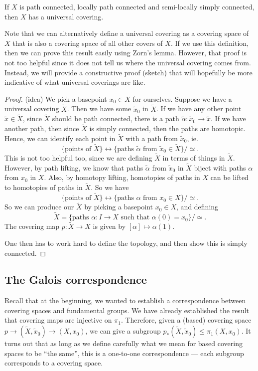\documentclass[a4paper]{article}
\begin{document}
\begin{thm}
  If $X$ is path connected, locally path connected and semi-locally simply connected, then $X$ has a universal covering.
\end{thm}
Note that we can alternatively define a universal covering as a covering space of $X$ that is also a covering space of all other covers of $X$. If we use this definition, then we can prove this result easily using Zorn's lemma. However, that proof is not too helpful since it does not tell us where the universal covering comes from. Instead, we will provide a constructive proof (sketch) that will hopefully be more indicative of what universal coverings are like.

\begin{proof}(idea)
  We pick a basepoint $x_0 \in X$ for ourselves. Suppose we have a universal covering $\tilde{X}$. Then we have some $\tilde{x}_0$ in $\tilde{X}$. If we have any other point $\tilde{x} \in \tilde{X}$, since $\tilde{X}$ should be path connected, there is a path $\tilde{\alpha}: \tilde{x}_0 \to \tilde{x}$. If we have another path, then since $\tilde{X}$ is simply connected, then the paths are homotopic. Hence, we can identify each point in $\tilde{X}$ with a path from $\tilde{x}_0$, ie.
  \[
    \{\text{points of }\tilde{X}\} \longleftrightarrow \{\text{paths }\tilde{\alpha}\text{ from }\tilde{x}_0\in \tilde{X}\}/{\simeq}.
  \]
  This is not too helpful too, since we are defining $\tilde{X}$ in terms of things in $\tilde{X}$. However, by path lifting, we know that paths $\tilde{\alpha}$ from $\tilde{x}_0$ in $\tilde{X}$ biject with paths $\alpha$ from $x_0$ in $X$. Also, by homotopy lifting, homotopies of paths in $X$ can be lifted to homotopies of paths in $\tilde{X}$. So we have
  \[
    \{\text{points of }\tilde{X}\} \longleftrightarrow \{\text{paths }\alpha\text{ from }x_0 \in X\}/{\simeq}.
  \]
  So we can produce our $\tilde{X}$ by picking a basepoint $x_0 \in X$, and defining
  \[
    \tilde{X} = \{\text{paths }\alpha: I\to X\text{ such that }\alpha(0) = x_0\}/{\simeq}.
  \]
  The covering map $p: \tilde{X} \to X$ is given by $[\alpha] \mapsto \alpha(1)$.

  One then has to work hard to define the topology, and then show this is simply connected.
\end{proof}

\subsection{The Galois correspondence}
Recall that at the beginning, we wanted to establish a correspondence between covering spaces and fundamental groups. We have already established the result that covering maps are injective on $\pi_1$. Therefore, given a (based) covering space $p \to (\tilde{X}, \tilde{x}_0) \to (X, x_0)$, we can give a subgroup $p_*(\tilde{X}, \tilde{x}_0)\leq \pi_1(X, x_0)$. It turns out that as long as we define carefully what we mean for based covering spaces to be ``the same'', this is a one-to-one correspondence --- each subgroup corresponds to a covering space.
\end{document}
